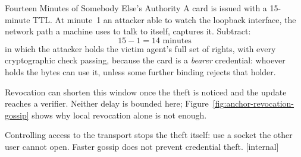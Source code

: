 \documentclass[11pt,a4paper]{article}
\theoremstyle{definition}
\begin{document}
\begin{pdexample}{Fourteen Minutes of Somebody Else's Authority}
\setlength{\parskip}{4pt plus 1pt}
A card is issued with a 15-minute TTL. At minute~1 an attacker able to watch
the loopback interface, the network path a machine uses to talk to itself,
captures it. Subtract:
\[
15 - 1 = 14 \text{ minutes}
\]
in which the attacker holds the victim agent's full
set of rights, with every cryptographic check passing, because the card is a
\emph{bearer} \mbox{credential}: whoever holds the bytes can use it, unless
some further binding rejects that holder.

Revocation can shorten this window once the theft is
noticed and the update reaches a verifier. Neither delay is bounded here;
Figure~\ref{fig:anchor-revocation-gossip} shows why local revocation alone is
not enough.

Controlling access to the transport stops the theft itself: use a socket
the other user cannot open. Faster gossip does not prevent credential theft.
[internal]
\end{pdexample}
\end{document}
